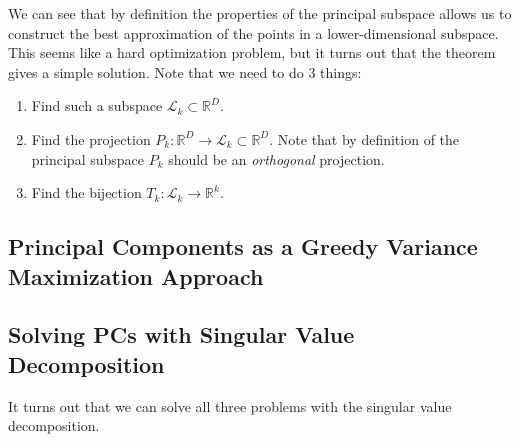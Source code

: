   We can see that by definition the properties of the principal subspace allows us to construct the best approximation of the points in a lower-dimensional subspace. This seems like a hard optimization problem, but it turns out that the theorem gives a simple solution. Note that we need to do 3 things: 
  \begin{enumerate}
    \item Find such a subspace $\mathcal{L}_k \subset \mathbb{R}^D$. 
    \item Find the projection $P_k: \mathbb{R}^D \rightarrow \mathcal{L}_k \subset \mathbb{R}^D$. Note that by definition of the principal subspace $P_k$ should be an \textit{orthogonal} projection. 
    \item Find the bijection $T_k: \mathcal{L}_k \rightarrow \mathbb{R}^k$. 
  \end{enumerate}

\subsection{Principal Components as a Greedy Variance Maximization Approach}

\subsection{Solving PCs with Singular Value Decomposition}

  It turns out that we can solve all three problems with the singular value decomposition. 

